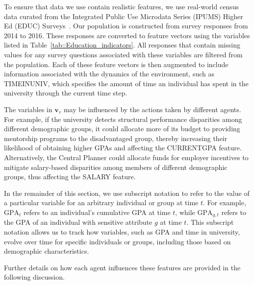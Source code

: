 To ensure that data we use contain realistic features, we use real-world census data curated from the Integrated Public Use Microdata Series (IPUMS) Higher Ed (EDUC) Surveys~\cite{ipums_higher_ed_2016}. Our population is constructed from survey responses from 2014 to 2016. These responses are converted to feature vectors using the variables listed in Table~\ref{tab::Education_indicators}. All responses that contain missing values for any survey questions associated with these variables are filtered from the population. Each of these feature vectors is then augmented to include information associated with the dynamics of the environment, such as TIMEINUNIV, which specifies the amount of time  an individual has spent in the university through the current time step.

The variables in $\mathbf{v}_{v}$ may be influenced by the actions taken by different agents. For example, if the university detects structural performance disparities among different demographic groups, it could allocate more of its budget to providing mentorship programs to the disadvantaged group, thereby increasing their likelihood of obtaining higher GPAs and affecting the CURRENTGPA feature. Alternatively, the Central Planner could allocate funds for employer incentives to mitigate salary-based disparities among members of different demographic groups, thus affecting the SALARY feature.

In the remainder of this section, we use subscript notation to refer to the value of a particular variable for an arbitrary individual or group at time $t$. For example, $\text{GPA}_t$ refers to an individual's cumulative GPA at time $t$, while $\text{GPA}_{g,t}$ refers to the GPA of an individual with sensitive attribute $g$ at time $t$. This subscript notation allows us to track how variables, such as GPA and time in university, evolve over time for specific individuals or groups, including those based on demographic characteristics.

Further details on how each agent influences these features are provided in the following discussion.


